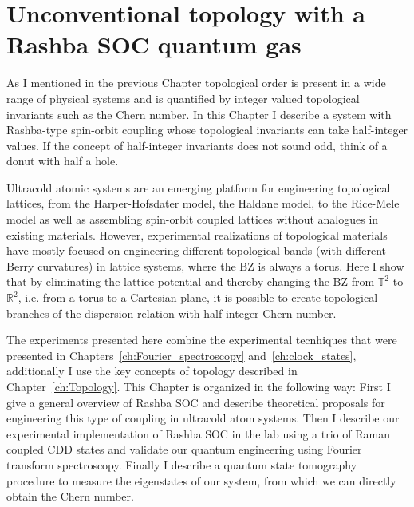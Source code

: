 
\renewcommand{\thechapter}{8}

\chapter{Unconventional topology with a Rashba SOC quantum gas}
\label{ch:Rashba}

As I mentioned in the previous Chapter topological order is present in a wide range of physical systems and is quantified by integer valued topological invariants such as the Chern number. In this Chapter I describe a system with Rashba-type spin-orbit coupling whose topological invariants can take half-integer values. If the concept of half-integer invariants does not sound odd, think of a donut with half a hole. 

Ultracold atomic systems are an emerging platform for engineering topological lattices, from the Harper-Hofsdater model\cite{miyake_realizing_2013,aidelsburger_realization_2013}, the Haldane model\cite{jotzu_experimental_2014}, to the Rice-Mele model\cite{lu_geometrical_2016,lohse_thouless_2016} as well as assembling spin-orbit coupled lattices without analogues in existing materials\cite{wu_realization_2016,sun_highly_2018}. However, experimental realizations of topological materials have mostly focused on engineering different topological bands (with different Berry curvatures) in lattice systems, where the BZ is always a torus. Here I show that by eliminating the lattice potential and thereby changing the BZ from ${\mathbb T}^2$ to ${\mathbb R}^2$, i.e. from a torus to a Cartesian plane, it is possible to create topological branches of the dispersion relation with half-integer Chern number. %

The experiments presented here combine the experimental tecnhiques that were presented in Chapters~\ref{ch:Fourier_spectroscopy} and~\ref{ch:clock_states}, additionally I use the key concepts of topology described in Chapter~\ref{ch:Topology}. This Chapter is organized in the following way: First I give a general overview of Rashba SOC and describe theoretical proposals for engineering this type of coupling in ultracold atom systems. Then I describe our experimental implementation of Rashba SOC in the lab using a trio of Raman coupled CDD states and validate our quantum engineering using Fourier transform spectroscopy. Finally I describe a quantum state tomography procedure to measure the eigenstates of our system, from which we can directly obtain the Chern number. 

